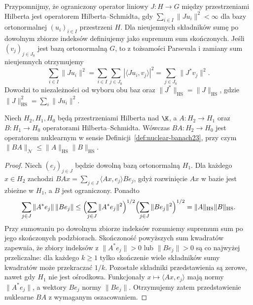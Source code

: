 Przypomnijmy, że ograniczony operator liniowy $J:H\to G$
między przestrzeniami Hilberta jest operatorem
Hilberta--Schmidta, gdy $\sum_{i\in I}\|Ju_i\|^2<\infty$
dla bazy ortonormalnej $(u_i)_{i\in I}$ przestrzeni $H$.
Dla nieujemnych składników sumę po dowolnym zbiorze
indeksów definiujemy jako supremum sum skończonych.
Jeśli $(v_j)_{j\in J_0}$ jest bazą ortonormalną $G$,
to z tożsamości Parsevala i zamiany sum nieujemnych
otrzymujemy
\[
 \sum_{i\in I}\|Ju_i\|^2
 =\sum_{i\in I}\sum_{j\in J_0}|\langle Ju_i,v_j\rangle|^2
 =\sum_{j\in J_0}\|J^*v_j\|^2.
\]
Dowodzi to niezależności od wyboru obu baz oraz
$\|J^*\|_{\mathrm{HS}}=\|J\|_{\mathrm{HS}}$, gdzie
$\|J\|_{\mathrm{HS}}^2=\sum_i\|Ju_i\|^2$.

\begin{lemat}
\label{lem:hs-compose-nuclear23}
Niech $H_2,H_1,H_0$ będą przestrzeniami Hilberta nad $\K$, a
$A:H_2\to H_1$ oraz $B:H_1\to H_0$ operatorami
Hilberta--Schmidta. Wówczas $BA:H_2\to H_0$ jest
operatorem nuklearnym w sensie
Definicji~\ref{def:nuclear-banach23}, przy czym
$\|BA\|_{\mathcal N}\le\|A\|_{\mathrm{HS}}\|B\|_{\mathrm{HS}}$.
\end{lemat}
\begin{proof}
Niech $(e_j)_{j\in J}$ będzie dowolną bazą ortonormalną $H_1$.
Dla każdego $x\in H_2$ zachodzi
$BAx=\sum_{j\in J}\langle Ax,e_j\rangle Be_j$,
gdyż rozwinięcie $Ax$ w bazie jest zbieżne w $H_1$,
a $B$ jest ograniczony. Ponadto
\[
 \sum_{j\in J}\|A^*e_j\|\,\|Be_j\|
 \le\Bigl(\sum_{j\in J}\|A^*e_j\|^2\Bigr)^{1/2}
     \Bigl(\sum_{j\in J}\|Be_j\|^2\Bigr)^{1/2}
 =\|A\|_{\mathrm{HS}}\|B\|_{\mathrm{HS}}.
\]
Przy sumowaniu po dowolnym zbiorze indeksów rozumiemy supremum
sum po jego skończonych podzbiorach. Skończoność powyższych sum
kwadratów zapewnia, że zbiory indeksów z
$\|A^*e_j\|>0$ lub $\|Be_j\|>0$ są co najwyżej przeliczalne:
dla każdego $k\ge1$ tylko skończenie wiele składników
sumy kwadratów może przekraczać $1/k$.
Pozostałe składniki przedstawienia są zerowe,
nawet gdy $H_1$ nie jest ośrodkowa. Funkcjonały
$x\mapsto\langle Ax,e_j\rangle$ mają normy $\|A^*e_j\|$,
a wektory $Be_j$ normy $\|Be_j\|$. Otrzymujemy zatem
przedstawienie nuklearne $BA$ z wymaganym oszacowaniem.
\end{proof}

